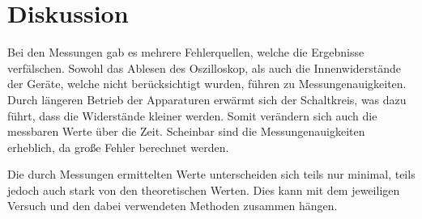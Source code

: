 \section{Diskussion}

Bei den Messungen gab es mehrere Fehlerquellen, welche die Ergebnisse verfälschen.
Sowohl das Ablesen des Oszilloskop, als auch die Innenwiderstände der Geräte, welche nicht berücksichtigt wurden, führen zu Messungenauigkeiten.
Durch längeren Betrieb der Apparaturen erwärmt sich der Schaltkreis, was dazu führt, dass die Widerstände kleiner werden. Somit verändern sich auch die messbaren Werte über die Zeit.
Scheinbar sind die Messungenauigkeiten erheblich, da große Fehler berechnet werden.

Die durch Messungen ermittelten Werte unterscheiden sich teils nur minimal, teils jedoch auch stark von den theoretischen Werten. Dies kann mit dem jeweiligen Versuch und den dabei verwendeten Methoden zusammen hängen.


